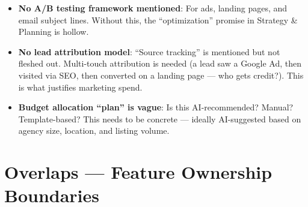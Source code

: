 \documentclass[12pt,a4paper]{article}
\begin{document}
\begin{itemize}[leftmargin=1.5em, itemsep=0.5em]
  \item \textbf{No A/B testing framework mentioned}: For ads, landing pages, and email subject lines. Without this, the ``optimization'' promise in Strategy \& Planning is hollow.

  \item \textbf{No lead attribution model}: ``Source tracking'' is mentioned but not fleshed out. Multi-touch attribution is needed (a lead saw a Google Ad, then visited via SEO, then converted on a landing page --- who gets credit?). This is what justifies marketing spend.

  \item \textbf{Budget allocation ``plan'' is vague}: Is this AI-recommended? Manual? Template-based? This needs to be concrete --- ideally AI-suggested based on agency size, location, and listing volume.
\end{itemize}

\section{Overlaps --- Feature Ownership Boundaries}
\end{document}
